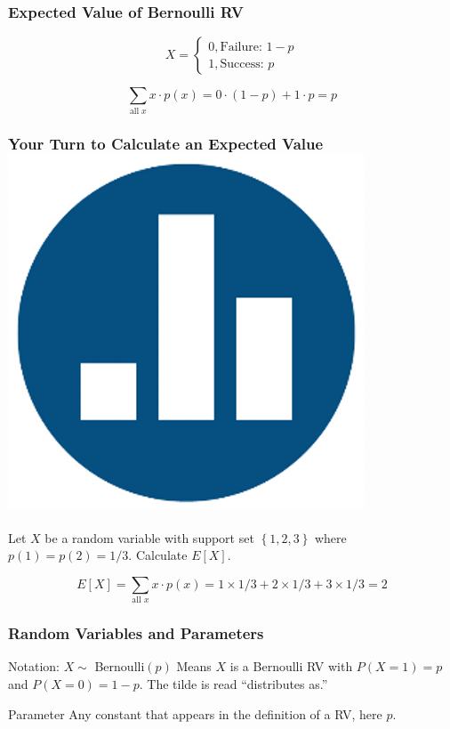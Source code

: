 \begin{frame}
  \frametitle{Expected Value of Bernoulli RV}
$$X = \left\{ \begin{array}{l}  0, \mbox{Failure: } 1-p\\ 1, \mbox{Success: } p\end{array} \right.$$

\vspace{2em}
 
$$\sum_{\mbox{all} \; x} x \cdot p(x) = 0 \cdot (1-p) + 1 \cdot p = p$$
\end{frame}
\begin{frame}
  \frametitle{Your Turn to Calculate an Expected Value \hfill\includegraphics[scale = 0.05]{./images/clicker}}
  Let $X$ be a random variable with support set $\left\{ 1,2,3 \right\}$ where $p(1)=p(2)=1/3$. Calculate $E[X]$.

  \pause

  \vspace{1em}
  \begin{equation*}
    E[X] = \sum_{\mbox{all }x} x \cdot p(x) = 1 \times 1/3 + 2 \times 1/3 + 3 \times 1/3 = 2
  \end{equation*}
\end{frame}

\begin{frame}
\frametitle{Random Variables and Parameters}



\begin{block}{Notation: $X \sim$ Bernoulli$(p)$}
Means $X$ is a Bernoulli RV with $P(X = 1) = p$ and $P(X= 0) = 1-p$. The tilde is read ``distributes as.''

\end{block}


\begin{block}{Parameter}
Any constant that appears in the definition of a RV, here $p$. 
\end{block}


\end{frame}

